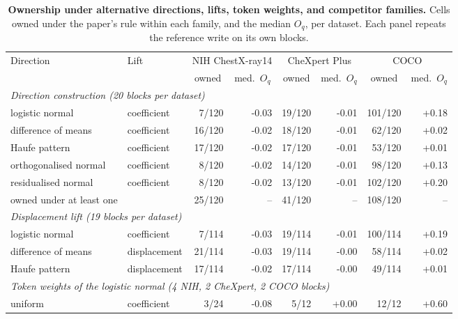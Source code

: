 \documentclass{article}
\begin{document}
\begin{table}[h]
\centering
\scriptsize
\setlength{\tabcolsep}{4pt}
\caption{\textbf{Ownership under alternative directions, lifts, token weights, and competitor families.} Cells owned under the paper's rule within each family, and the median $O_q$, per dataset. Each panel repeats the reference write on its own blocks.}
\label{tab:cf-altdir}
\begin{tabular}{llrrrrrr}
\toprule
\multirow{2}{*}{Direction} & \multirow{2}{*}{Lift} & \multicolumn{2}{c}{NIH ChestX-ray14} & \multicolumn{2}{c}{CheXpert Plus} & \multicolumn{2}{c}{COCO}\\
\cmidrule(lr){3-4}\cmidrule(lr){5-6}\cmidrule(lr){7-8}
&  & \multicolumn{1}{c}{owned} & \multicolumn{1}{c}{med.\ $O_q$} & \multicolumn{1}{c}{owned} & \multicolumn{1}{c}{med.\ $O_q$} & \multicolumn{1}{c}{owned} & \multicolumn{1}{c}{med.\ $O_q$}\\
\midrule
\multicolumn{8}{l}{\textit{Direction construction (20 blocks per dataset)}} \\
\quad logistic normal & coefficient & 7/120 & -0.03 & 19/120 & -0.01 & 101/120 & +0.18 \\
\quad difference of means & coefficient & 16/120 & -0.02 & 18/120 & -0.01 & 62/120 & +0.02 \\
\quad Haufe pattern & coefficient & 17/120 & -0.02 & 17/120 & -0.01 & 53/120 & +0.01 \\
\quad orthogonalised normal & coefficient & 8/120 & -0.02 & 14/120 & -0.01 & 98/120 & +0.13 \\
\quad residualised normal & coefficient & 8/120 & -0.02 & 13/120 & -0.01 & 102/120 & +0.20 \\
\quad owned under at least one &  & 25/120 & -- & 41/120 & -- & 108/120 & -- \\
\midrule
\multicolumn{8}{l}{\textit{Displacement lift (19 blocks per dataset)}} \\
\quad logistic normal & coefficient & 7/114 & -0.03 & 19/114 & -0.01 & 100/114 & +0.19 \\
\quad difference of means & displacement & 21/114 & -0.03 & 19/114 & -0.00 & 58/114 & +0.02 \\
\quad Haufe pattern & displacement & 17/114 & -0.02 & 17/114 & -0.00 & 49/114 & +0.01 \\
\midrule
\multicolumn{8}{l}{\textit{Token weights of the logistic normal (4 NIH, 2 CheXpert, 2 COCO blocks)}} \\
\quad uniform & coefficient & 3/24 & -0.08 & 5/12 & +0.00 & 12/12 & +0.60 \\

\end{tabular}
\end{table}
\end{document}

